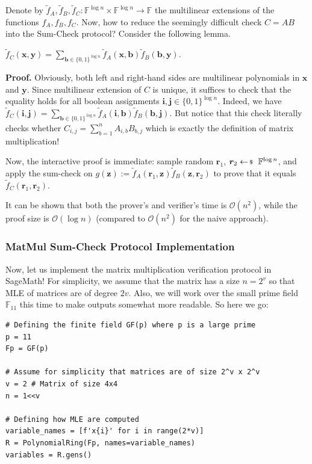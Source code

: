Denote by $\widetilde{f}_A, \widetilde{f}_B, \widetilde{f}_C: \mathbb{F}^{\log n} \times \mathbb{F}^{\log n} \to \mathbb{F}$ the
multilinear extensions of the functions $f_A, f_B, f_C$. Now, how to 
reduce the seemingly difficult check $C = AB$ into the Sum-Check
protocol? Consider the following lemma.
\begin{lemma}
    $\widetilde{f}_C(\mathbf{x},\mathbf{y}) = \sum_{\boldsymbol{b} \in \{0,1\}^{\log n}} \widetilde{f}_A(\mathbf{x}, \boldsymbol{b})\widetilde{f}_B(\boldsymbol{b}, \mathbf{y})$.
\end{lemma}

\textbf{Proof.} Obviously, both left and right-hand sides are multilinear
polynomials in $\mathbf{x}$ and $\mathbf{y}$. Since multilinear extension of $C$
is unique, it suffices to check that the equality holds for all boolean
assignments $\boldsymbol{i}, \boldsymbol{j} \in \{0,1\}^{\log n}$. Indeed, we
have $\widetilde{f}_C(\boldsymbol{i},\boldsymbol{j}) = \sum_{\boldsymbol{b} \in
\{0,1\}^{\log n}} \widetilde{f}_A(\boldsymbol{i},
\boldsymbol{b})\widetilde{f}_B(\boldsymbol{b}, \boldsymbol{j})$. But notice that
this check literally checks whether $C_{i,j} = \sum_{b=1}^n A_{i,b}B_{b,j}$
which is exactly the definition of matrix multiplication!

Now, the interactive proof is immediate: sample random $\boldsymbol{r}_1$,
$\boldsymbol{r}_2 \leftarrowS \mathbb{F}^{\log n}$, and apply the sum-check
on $g(\mathbf{z}) := \widetilde{f}_A(\boldsymbol{r}_1,
\mathbf{z})\widetilde{f}_B(\mathbf{z}, \boldsymbol{r}_2)$ to prove that it 
equals $\widetilde{f}_C(\boldsymbol{r}_1, \boldsymbol{r}_2)$.

It can be shown that both the prover's and verifier's time is
$\mathcal{O}(n^2)$, while the proof size is $\mathcal{O}(\log n)$ (compared to
$\mathcal{O}(n^2)$ for the naive approach).

\subsubsection{MatMul Sum-Check Protocol Implementation}

Now, let us implement the matrix multiplication verification protocol in
SageMath! For simplicity, we assume that the matrix has a size $n=2^v$ so that
MLE of matrices are of degree $2v$. Also, we will work over the small prime
field $\mathbb{F}_{11}$ this time to make outputs somewhat more readable. 
So here we go:
\begin{verbatim}
# Defining the finite field GF(p) where p is a large prime
p = 11
Fp = GF(p)

# Assume for simplicity that matrices are of size 2^v x 2^v
v = 2 # Matrix of size 4x4
n = 1<<v

# Defining how MLE are computed
variable_names = [f'x{i}' for i in range(2*v)]
R = PolynomialRing(Fp, names=variable_names)
variables = R.gens()
\end{verbatim}

